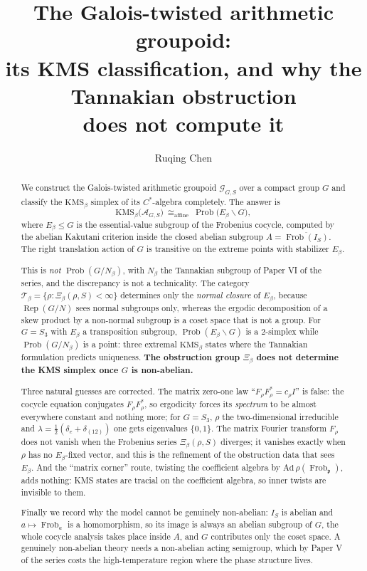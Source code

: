 \documentclass[11pt]{amsart}
\title[The Galois-twisted groupoid]{The Galois-twisted arithmetic groupoid:\\ its KMS classification, and why the Tannakian obstruction\\ does not compute it}
\author{Ruqing Chen}
\date{}
\numberwithin{equation}{section}
\theoremstyle{definition}
\theoremstyle{remark}
\newcommand{\cA}{\mathcal{A}}
\newcommand{\cG}{\mathcal{G}}
\newcommand{\cT}{\mathcal{T}}
\newcommand{\pp}{\mathfrak{p}}
\newcommand{\Frob}{\operatorname{Frob}}
\newcommand{\Rep}{\operatorname{Rep}}
\newcommand{\Prob}{\operatorname{Prob}}
\begin{document}
\begin{abstract}
We construct the Galois-twisted arithmetic groupoid $\cG_{G,S}$ over a compact group $G$ and
classify the $\mathrm{KMS}_\beta$ simplex of its $C^*$-algebra completely. The answer is
\[
\mathrm{KMS}_\beta\bigl(\cA_{G,S}\bigr)\ \cong_{\mathrm{affine}}\ \Prob\bigl(E_\beta\backslash G\bigr),
\]
where $E_\beta\le G$ is the essential-value subgroup of the Frobenius cocycle, computed by
the abelian Kakutani criterion inside the closed abelian subgroup
$A=\overline{\Frob(I_S)}$. The right translation action of $G$ is transitive on the extreme
points with stabilizer $E_\beta$.

This is \emph{not} $\Prob(G/N_\beta)$, with $N_\beta$ the Tannakian subgroup of Paper VI
of the series, and the discrepancy is not a technicality. The category
$\cT_\beta=\{\rho:\Xi_\beta(\rho,S)<\infty\}$ determines only the \emph{normal closure} of
$E_\beta$, because $\Rep(G/N)$ sees normal subgroups only, whereas the ergodic decomposition
of a skew product by a non-normal subgroup is a coset space that is not a group. For
$G=S_3$ with $E_\beta$ a transposition subgroup, $\Prob(E_\beta\backslash G)$ is a $2$-simplex
while $\Prob(G/N_\beta)$ is a point: three extremal $\mathrm{KMS}_\beta$ states where the
Tannakian formulation predicts uniqueness. \textbf{The obstruction group $\Xi_\beta$ does not
determine the KMS simplex once $G$ is non-abelian.}

Three natural guesses are corrected. The matrix zero-one law
``$F_\rho F_\rho^*=c_\rho I$'' is false: the cocycle equation conjugates $F_\rho F_\rho^*$, so
ergodicity forces its \emph{spectrum} to be almost everywhere constant and nothing more; for
$G=S_3$, $\rho$ the two-dimensional irreducible and $\lambda=\frac12(\delta_e+\delta_{(12)})$
one gets eigenvalues $\{0,1\}$. The matrix Fourier transform $F_\rho$ does not vanish when
the Frobenius series $\Xi_\beta(\rho,S)$ diverges; it vanishes exactly when $\rho$ has no
$E_\beta$-fixed vector, and this is the refinement of the obstruction data that sees
$E_\beta$. And the ``matrix corner'' route, twisting the coefficient algebra by
$\mathrm{Ad}\,\rho(\Frob_\pp)$, adds nothing: KMS states are tracial on the coefficient
algebra, so inner twists are invisible to them.

Finally we record why the model cannot be genuinely non-abelian: $I_S$ is abelian and
$a\mapsto\Frob_a$ is a homomorphism, so its image is always an abelian subgroup of $G$, the
whole cocycle analysis takes place inside $A$, and $G$ contributes only the coset space. A
genuinely non-abelian theory needs a non-abelian acting semigroup, which by Paper V of the
series costs the high-temperature region where the phase structure lives.
\end{abstract}
\end{document}

